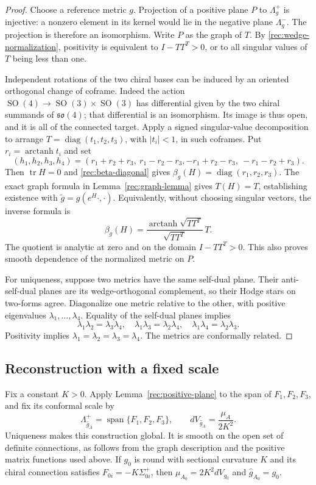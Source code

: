 \documentclass[11pt]{article}
\numberwithin{equation}{section}
\theoremstyle{definition}
\theoremstyle{remark}
\begin{document}
\begin{proof}
Choose a reference metric $g$.  Projection of a positive plane $P$ to
$\Lambda_g^+$ is injective: a nonzero element in its kernel would lie in
the negative plane $\Lambda_g^-$.  The projection is therefore an
isomorphism.  Write $P$ as the graph of $T$.  By
\eqref{rec:wedge-normalization}, positivity is equivalent to
$I-TT^T>0$, or to all singular values of $T$ being less than one.

Independent rotations of the two chiral bases can be induced by an
oriented orthogonal change of coframe.  Indeed the action
$\operatorname{SO}(4)\to\operatorname{SO}(3)\times\operatorname{SO}(3)$
has differential given by the two chiral summands of
$\mathfrak{so}(4)$; that differential is an isomorphism.  Its image is
thus open, and it is all of the connected target.  Apply a signed
singular-value decomposition to arrange
$T=\operatorname{diag}(t_1,t_2,t_3)$, with $|t_i|<1$, in such coframes.
Put $r_i=\operatorname{arctanh}t_i$ and set
\[
 (h_1,h_2,h_3,h_4)
  =(r_1+r_2+r_3,\ r_1-r_2-r_3,
                  -r_1+r_2-r_3,\ -r_1-r_2+r_3).
\]
Then $\operatorname{tr}H=0$ and \eqref{rec:beta-diagonal} gives
$\beta_g(H)=\operatorname{diag}(r_1,r_2,r_3)$.
The exact graph formula in Lemma~\ref{rec:graph-lemma} gives
$T(H)=T$, establishing existence with $\widetilde g=g(e^H\cdot,\cdot)$.
Equivalently, without choosing singular vectors, the inverse formula is
\[
 \beta_g(H)=
   \frac{\operatorname{arctanh}\sqrt{TT^T}}{\sqrt{TT^T}}\,T.
\]
The quotient is analytic at zero and on the domain $I-TT^T>0$.
This also proves smooth dependence of the normalized metric on $P$.

For uniqueness, suppose two metrics have the same self-dual plane.
Their anti-self-dual planes are its wedge-orthogonal complement, so
their Hodge stars on two-forms agree.  Diagonalize one metric relative
to the other, with positive eigenvalues $\lambda_1,\ldots,\lambda_4$.
Equality of the self-dual planes implies
\[
 \lambda_1\lambda_2=\lambda_3\lambda_4,\quad
 \lambda_1\lambda_3=\lambda_2\lambda_4,\quad
 \lambda_1\lambda_4=\lambda_2\lambda_3.
\]
Positivity implies $\lambda_1=\lambda_2=\lambda_3=\lambda_4$.
The metrics are conformally related.
\end{proof}

\subsection{Reconstruction with a fixed scale}

Fix a constant $K>0$.  Apply Lemma~\ref{rec:positive-plane} to the span
of $F_1,F_2,F_3$, and fix its conformal scale by
\begin{equation}
 \Lambda_{\widehat g_A}^+=\operatorname{span}\{F_1,F_2,F_3\},
 \qquad dV_{\widehat g_A}=\frac{\mu_A}{2K^2}.
 \label{rec:metric-definition}
\end{equation}
Uniqueness makes this construction global.  It is smooth on the open
set of definite connections, as follows from the graph
description and the positive matrix functions used above.  If $g_0$ is
round with sectional curvature $K$ and its chiral connection satisfies
$F_{0i}=-K\Sigma_{0i}^+$, then
$\mu_{A_0}=2K^2dV_{g_0}$ and $\widehat g_{A_0}=g_0$.
\end{document}

